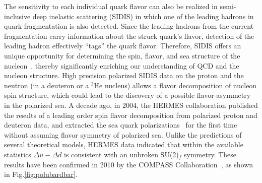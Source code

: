 The sensitivity to each individual quark flavor can also be realized
in semi-inclusive deep inelastic scattering (SIDIS)
in which one of the leading hadrons in quark fragmentation is also detected.
Since the leading hadrons from the current fragmentation 
carry information about
the struck quark's flavor, detection of the leading hadron 
effectively ``tags'' the quark flavor.
Therefore, SIDIS offers an unique opportunity 
for determining the spin, flavor, and sea structure of the nucleon~\cite{LFrankfurt1989141},
thereby significantly enriching 
our understanding of QCD and the nucleon structure. 
High precision polarized SIDIS data on the proton and the neutron 
(in a deuteron or a $^3$He nucleus) allows
a flavor decomposition of nucleon spin structure, which could lead to
the discovery of a possible flavor-asymmetry in the polarized sea.
A decade ago, in 2004, the HERMES collaboration
published the results of a leading order spin flavor decomposition from polarized 
proton and deuteron data, and extracted the sea quark 
polarizations~\cite{Airapetian:2004zf}  for the first time without assuming  flavor symmetry of polarized sea. Unlike 
the predictions of several theoretical models,
HERMES data indicated that within the available statistics
$\Delta \bar{u}- \Delta \bar{d}$ is consistent
with an unbroken SU(2)$_f$ symmetry.  These results have been confirmed in 2010 by the COMPASS Collaboration~\cite{Alekseev:2010ub},   as shown in Fig.\ref{fig:polubardbar}. 

